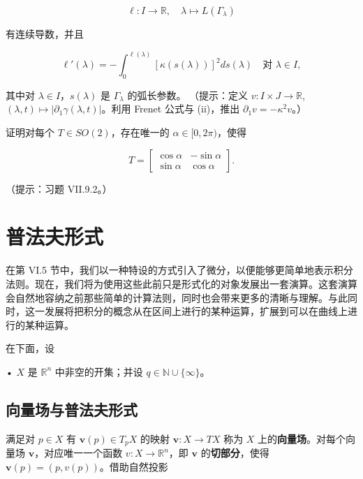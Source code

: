 \begin{exercises}
\begin{subitems}
\[
\ell : I \to \mathbb{R} ,\quad \lambda \mapsto L(\Gamma_{\lambda})
\]

有连续导数，并且

\[
\ell'(\lambda) = -\int_{0}^{\ell(\lambda)} [\kappa(s(\lambda))]^{2}ds(\lambda) \quad \text{对 } \lambda \in I ,
\]

其中对 $ \lambda \in I $，$ s(\lambda) $ 是 $ \Gamma_{\lambda} $ 的弧长参数。
（提示：定义 $ v : I \times J \to \mathbb{R} $, $ (\lambda,t) \mapsto |\partial_{1}\gamma(\lambda,t)| $。利用 Frenet 公式与 (ii)，推出 $ \partial_{1}v = -\kappa^{2}v $。）

\end{subitems}

\item

证明对每个 $ T \in SO(2) $，存在唯一的 $ \alpha \in [0, 2\pi) $，使得

\begin{equation*}
T = \begin{bmatrix} \cos\alpha & -\sin\alpha \\ \sin\alpha & \cos\alpha \end{bmatrix} .
\end{equation*}

（提示：习题 VII.9.2。）

\end{exercises}

\section{普法夫形式}

在第 VI.5 节中，我们以一种特设的方式引入了微分，以便能够更简单地表示积分法则。现在，我们将为使用这些此前只是形式化的对象发展出一套演算。这套演算会自然地容纳之前那些简单的计算法则，同时也会带来更多的清晰与理解。与此同时，这一发展将把积分的概念从在区间上进行的某种运算，扩展到可以在曲线上进行的某种运算。

在下面，设

• $ X $ 是 $ \mathbb{R}^{n} $ 中非空的开集；并设 $ q \in \mathbb{N} \cup \{\infty\} $。

\subsection*{向量场与普法夫形式}

满足对 $ p \in X $ 有 $ \boldsymbol{v}(p) \in T_{p}X $ 的映射 $ \boldsymbol{v} : X \to TX $ 称为 $ X $ 上的\textbf{向量场}。对每个向量场 $ \boldsymbol{v} $，对应唯一一个函数 $ v : X \to \mathbb{R}^{n} $，即 $ \boldsymbol{v} $ 的\textbf{切部分}，使得 $ \boldsymbol{v}(p) = (p,v(p)) $。借助自然投影

